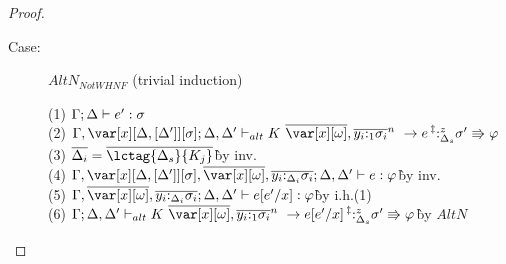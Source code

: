 \begin{proof}
\begin{description}
\item[Case:] $AltN_{Not WHNF}$ (trivial induction)
\begin{tabbing}
  (1) $\Gamma; \Delta \vdash e' : \sigma$\\
  (2) $\G,\xD; \D,\D' \vdash_{alt} \konstructor~\to e \prescript{\ddag}{}{:^z_{\D_s}} \s' \Rrightarrow \vp$\\
  (3) $\ov{\D_i} = \ov{\lctag{\D_s}{K_j}}$\`by inv.\\
  (4) $\G,\xD,\ov{\xo},\ov{y_i{:}_{\D_i}\s_i}; \D, \D' \vdash e : \vp$\` by inv.\\
  (5) $\G,\ov{\xo},\ov{y_i{:}_{\D_i}\s_i}; \D, \D' \vdash e[e'/x] : \vp$\` by i.h.(1)\\
  (6) $\G; \D,\D' \vdash_{alt} \konstructor~\to e[e'/x] \prescript{\ddag}{}{:^z_{\D_s}} \s' \Rrightarrow \vp$\` by $AltN$\\
\end{tabbing}


\end{description}
\end{proof}
